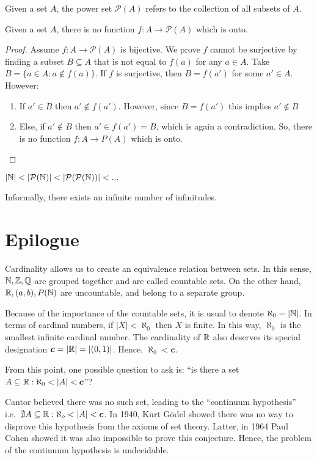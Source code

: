 Given a set $A$, the power set $\mathcal{P}(A)$ refers to the collection of all subsets of $A$.

\begin{theorem}
    Given a set $A$, there is no function $f: A \to \mathcal{P}(A)$ which is onto.    
\end{theorem}

\begin{proof}
    Assume $f: A \to \mathcal{P}(A)$ is bijective. We prove $f$ cannot be surjective by finding a subset $B \subseteq A$ that is not equal to $f(a)$ for any $a \in A$. Take $B = \{a \in A: a \notin f(a)\}$. If $f$ is surjective, then $B = f(a')$ for some $a' \in A$. However: \\
    \begin{enumerate}
        \item If $a' \in B$ then $a' \notin f(a')$. However, since $B = f(a')$ this implies $a' \notin B$
        \item Else, if $a' \notin B$ then $a' \in f(a') = B$, which is again a contradiction. So, there is no function $f: A \to P(A)$ which is onto.    
    \end{enumerate}
\end{proof}

\begin{theorem}
    $|\mathbb{N}| < |\mathcal{P}(\mathbb{N})| < |\mathcal{P}(\mathcal{P}(\mathbb{N}))| < ...$
\end{theorem}

Informally, there exists an infinite number of infinitudes.

\section{Epilogue}

Cardinality allows us to create an equivalence relation between sets. In this sense, $\mathbb{N}, \mathbb{Z}, \mathbb{Q}$ are grouped together and are called countable sets. On the other hand, $\mathbb{R}, (a,b), P(\mathbb{N})$ are uncountable, and belong to a separate group.


Because of the importance of the countable sets, it is usual to denote $\aleph_0 = |\mathbb{N}|$. In terms of cardinal numbers, if $|X| < \aleph_0$ then $X$ is finite. In this way, $\aleph_0$ is the smallest infinite cardinal number. The cardinality of $\mathbb{R}$ also deserves its special designation $\bm c = |\mathbb{R}| = |(0,1)|$. Hence, $\aleph_0 < \bm{c}$.

From this point, one possible question to ask is: ``is there a set $A \subseteq \mathbb{R}: \aleph_0 < |A| < \bm c$''?

Cantor believed there was no such set, leading to the ``continuum hypothesis'' i.e.~$\nexists A \subseteq \mathbb{R}: \aleph_o < |A| < \bm c$. In 1940, Kurt Gödel showed there was no way to disprove this hypothesis from the axioms of set theory. Latter, in 1964 Paul Cohen showed it was also impossible to prove this conjecture. Hence, the problem of the continuum hypothesis is undecidable.